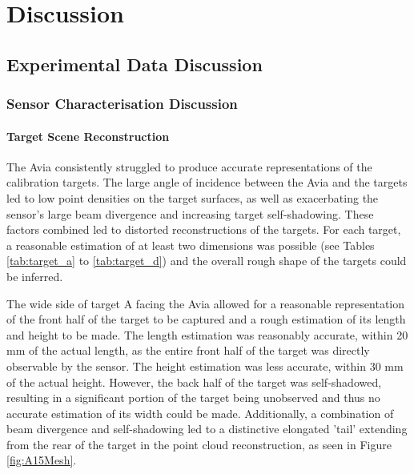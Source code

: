 \chapter{Discussion}
\label{ch:discussion}
\section{Experimental Data Discussion}
\label{sec:ch8.section1}

\subsection{Sensor Characterisation Discussion}
\label{subsec:ch8.section1.subsec1}

\subsubsection{Target Scene Reconstruction}
\label{subsubsec:ch8.section1.subsec1.subsubsection1}

The Avia consistently struggled to produce accurate representations of the calibration targets. The large angle of incidence between the Avia and the targets led to low point densities on the target surfaces, as well as exacerbating the sensor's large beam divergence and increasing target self-shadowing. These factors combined led to distorted reconstructions of the targets. For each target, a reasonable estimation of at least two dimensions was possible (see Tables \ref{tab:target_a} to \ref{tab:target_d}) and the overall rough shape of the targets could be inferred.

The wide side of target A facing the Avia allowed for a reasonable representation of the front half of the target to be captured and a rough estimation of its length and height to be made. The length estimation was reasonably accurate, within 20 mm of the actual length, as the entire front half of the target was directly observable by the sensor. The height estimation was less accurate, within 30 mm of the actual height. However, the back half of the target was self-shadowed, resulting in a significant portion of the target being unobserved and thus no accurate estimation of its width could be made. Additionally, a combination of beam divergence and self-shadowing led to a distinctive elongated 'tail' extending from the rear of the target in the point cloud reconstruction, as seen in Figure \ref{fig:A15Mesh}.

